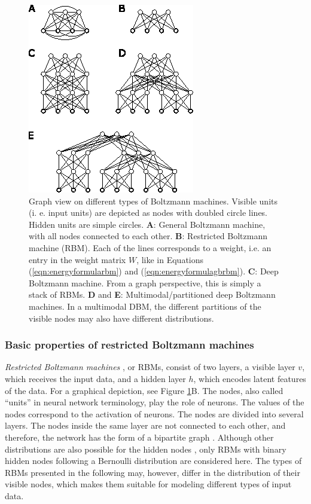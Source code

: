 \documentclass[12pt]{article}
\begin{document}
\begin{figure}[h]

   \centering
   \includegraphics[scale=3.]{images/BMsOverview.eps}
   \caption{Graph view on different types of Boltzmann machines. Visible units (i. e. input units) are depicted as nodes with doubled circle lines. Hidden units are simple circles.
 {\bf A}: General Boltzmann machine, with all nodes connected to each other. {\bf B}: Restricted Boltzmann machine (RBM). Each of the lines corresponds to a weight, i.e. an entry in the weight matrix $W$, like in Equations (\ref{eqn:energyformularbm}) and (\ref{eqn:energyformulagbrbm}).
{\bf C}: Deep Boltzmann machine. From a graph perspective, this is simply a stack of RBMs.
{\bf D} and {\bf E}: Multimodal/partitioned deep Boltzmann machines. In a multimodal DBM, the different partitions of the visible nodes may also have different distributions.}
   \label{fig:bmsoverview}
 \end{figure}


\subsubsection{Basic properties of restricted Boltzmann machines}\label{rbmtypes}

\emph{Restricted Boltzmann machines} \citep{smolensky1986foundations}, or RBMs,  consist of two layers, a visible layer $v$, which receives the input data, and a hidden layer $h$, which encodes latent features of the data. For a graphical depiction, see Figure \ref{fig:bmsoverview}B.
The nodes, also called ``units'' in neural network terminology, play the role of neurons.
The values of the nodes correspond to the activation of neurons.
The nodes are divided into several layers.
The nodes inside the same layer are not connected to each other, and therefore, the network has the form of a bipartite graph \citep{diestelgraph}.
Although other distributions are also possible for the hidden nodes \citep{hinton_practical_2012}, only RBMs with binary hidden nodes following a Bernoulli distribution are considered here.
The types of RBMs presented in the following may, however, differ in the distribution of their visible nodes, which makes them suitable for modeling different types of input data.
\end{document}
